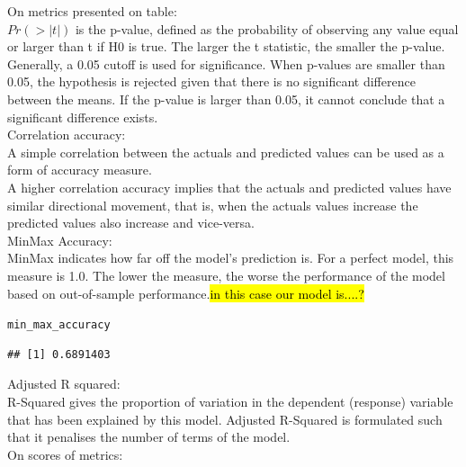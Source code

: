 \documentclass[10pt]{article}\usepackage[]{graphicx}\usepackage[]{color}
\makeatletter
\newcommand{\hlstd}[1]{\textcolor[rgb]{0.345,0.345,0.345}{#1}}%
\newenvironment{kframe}{%
 \def\at@end@of@kframe{}%
 \ifinner\ifhmode%
  \def\at@end@of@kframe{\end{minipage}}%
  \begin{minipage}{\columnwidth}%
 \fi\fi%
 \def\FrameCommand##1{\hskip\@totalleftmargin \hskip-\fboxsep
 \colorbox{shadecolor}{##1}\hskip-\fboxsep
     \hskip-\linewidth \hskip-\@totalleftmargin \hskip\columnwidth}%
 \MakeFramed {\advance\hsize-\width
   \@totalleftmargin\z@ \linewidth\hsize
   \@setminipage}}%
 {\par\unskip\endMakeFramed%
 \at@end@of@kframe}
\newenvironment{knitrout}{}{} %
\makeatother
\begin{document}
On metrics presented on table:\\

$Pr(>|t|)$ is the p-value, defined as the probability of observing any value equal or larger than t if H0 is true. The larger the t statistic, the smaller the p-value. Generally, a 0.05 cutoff is used for significance. When p-values are smaller than 0.05, the hypothesis is rejected given that there is no significant difference between the means. If the p-value is larger than 0.05, it cannot conclude that a significant difference exists.\\

Correlation accuracy:\\
A simple correlation between the actuals and predicted values can be used as a form of accuracy measure.\\
A higher correlation accuracy implies that the actuals and predicted values have similar directional movement, that is, when the actuals values increase the predicted values also increase and vice-versa.\\

MinMax Accuracy:\\
MinMax indicates how far off the model's prediction is. For a perfect model, this measure is 1.0. The lower the measure, the worse the performance of the model based on out-of-sample performance.\hl{in this case our model is....?}\\


\begin{knitrout}\small
{}\color{fgcolor}\begin{kframe}
\begin{alltt}
\hlstd{min_max_accuracy}
\end{alltt}
\begin{verbatim}
## [1] 0.6891403
\end{verbatim}
\end{kframe}
\end{knitrout}

Adjusted R squared:\\
R-Squared gives the proportion of variation in the dependent (response) variable that has been explained by this model. Adjusted R-Squared is formulated such that it penalises the number of terms of the model.\\


On scores of metrics:\\
\end{document}
